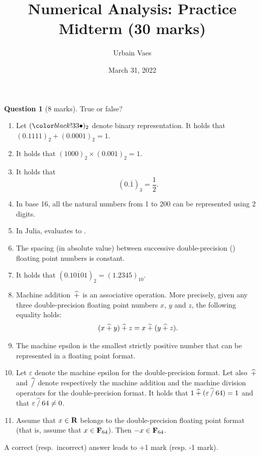 \documentclass[11pt]{article}
\theoremstyle{definition}
\newtheorem{question}{Question}
\begin{document}
\title{Numerical Analysis: Practice Midterm (30 marks)}
\author{Urbain Vaes}
\date{March 31, 2022}
\maketitle

\begin{question}
    [8 marks]
    True or false?
    \begin{enumerate}
        \item Let $(\placeholder)_2$ denote binary representation.
            It holds that
            \(
                (0.1111)_2 + (0.0001)_2 = 1.
            \)
        \item It holds that
            \(
                (1000)_2 \times (0.001)_2 = 1.
            \)
        \item It holds that
            \[
                (0.\overline{1})_3 = \frac{1}{2}.
            \]
        \item In base 16, all the natural numbers from 1 to 200 can be represented using 2 digits.
        \item In Julia,  evaluates to .
        \item The spacing (in absolute value) between successive double-precision () floating point numbers is constant.
        \item It holds that $(0.\overline{10101})_2 = (1.2345)_{10}$.
        \item Machine addition~$\mathbin{\widehat +}$ is an associative operation.
            More precisely, given any three double-precision floating point numbers $x$, $y$ and $z$,
            the following equality holds:
            \[
                (x \mathbin{\widehat +} y) \mathbin{\widehat +} z = x \mathbin{\widehat +} (y \mathbin{\widehat +} z).
            \]
        \item
            The machine epsilon is the smallest strictly positive number that can be represented in a floating point format.

        \item
            Let $\varepsilon$ denote the machine epsilon for the double-precision format.
            Let also~$\mathbin{\widehat +}$ and~$\mathbin{\widehat /}$ denote respectively the machine addition and the machine division operators for the double-precision format.
            It holds that $1 \mathbin{\widehat +} (\varepsilon \mathbin{\widehat /} 64) = 1$ and that $\varepsilon \mathbin{\widehat /} 64 \neq 0$.

        \item
            Assume that $x \in \mathbf R$ belongs to the double-precision floating point format (that is,
            assume that $x \in \mathbf F_{64}$).
            Then $-x \in \mathbf F_{64}$.
    \end{enumerate}
    A correct (resp.~incorrect) answer leads to +1 mark (resp. -1 mark).
\end{question}
\end{document}

